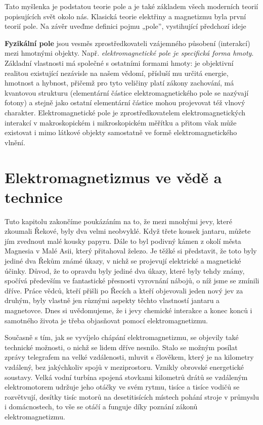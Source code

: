     Tato myšlenka je podstatou teorie pole a je také základem všech moderních teorií popisujících svět 
    okolo nás. Klasická teorie elektřiny a magnetizmu byla první teorií pole. Na závěr uveďme definici 
    pojmu „pole”, vystihující předchozí ideje
    \begin{definition}
      \textbf{Fyzikální pole} jsou vesměs zprostředkovateli vzájemného působení (interakcí) mezi hmotnými 
      objekty. Např. \emph{elektromagnetické pole je specifická forma hmoty}. Základní vlastnosti má 
      společné s ostatními formami hmoty: je objektivní realitou existující nezávisle na našem vědomí, 
      přísluší mu určitá energie, hmotnost a hybnost, přičemž pro tyto veličiny platí zákony zachování, má 
      kvantovou strukturu (elementární částice elektromagnetického pole se nazývají fotony) a stejně jako 
      ostatní elementární částice mohou projevovat též vlnový charakter. Elektromagnetické pole je 
      zprostředkovatelem elektromagnetických interakcí v makroskopickém i mikroskopickém měřítku a přitom 
      však může existovat i mimo látkové objekty samostatně ve formě elektromagnetického vlnění.
    \end{definition}                 

  \section{Elektromagnetizmus ve vědě a technice}  
    \cite[s.~25]{Feynman02} Tuto kapitolu zakončíme poukázáním na to, že mezi mnohými jevy, které 
    zkoumali Řekové, byly dva velmi neobvyklé. Když třete kousek jantaru, můžete jím zvednout malé 
    kousky papyru. Dále to byl podivný kámen z okolí města Magnesia v Malé Asii, který přitahoval 
    železo. Je těžké si představit, že toto byly jediné dva Řekům známé úkazy, v nichž se projevují 
    elektrické a magnetické účinky. Důvod, že  to opravdu byly jediné dva úkazy, které byly tehdy 
    známy, spočívá především ve fantastické přesnosti vyrovnání nábojů, o níž jsme se zmínili dříve. 
    Práce vědců, kteří přišli po Řecích a kteří objevovali jeden nový jev za druhým, byly vlastně 
    jen různými aspekty těchto vlastností jantaru a magnetovce. Dnes si uvědomujeme, že i jevy 
    chemické interakce a konec konců i samotného života je třeba objasňovat pomocí elektromagnetizmu.

    Současně s tím, jak se vyvíjelo chápání elektromagnetizmu, se objevily také technické možnosti, 
    o nichž se lidem dříve nesnilo. Stalo se možným posílat zprávy telegrafem na velké vzdálenosti, 
    mluvit s člověkem, který je na kilometry vzdálený, bez jakýchkoliv spojů v meziprostoru. Vznikly 
    obrovské energetické soustavy. Velká vodní turbína spojená stovkami kilometrů drátů se vzdáleným 
    elektromotorem udržuje jeho otáčky ve svém rytmu, tisíce a tisíce vodičů se rozvětvují, desítky 
    tisíc motorů na desetitisících místech pohání stroje v průmyslu i domácnostech, to vše se otáčí 
    a funguje díky poznání zákonů elektromagnetizmu.

